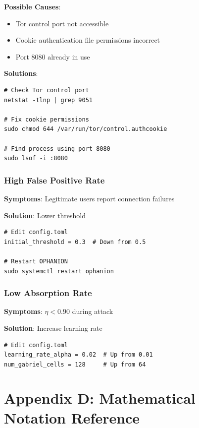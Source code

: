 \documentclass[11pt,a4paper]{article}
\begin{document}
\textbf{Possible Causes}:
\begin{itemize}
\item Tor control port not accessible
\item Cookie authentication file permissions incorrect
\item Port 8080 already in use
\end{itemize}

\textbf{Solutions}:
\begin{verbatim}
# Check Tor control port
netstat -tlnp | grep 9051

# Fix cookie permissions
sudo chmod 644 /var/run/tor/control.authcookie

# Find process using port 8080
sudo lsof -i :8080
\end{verbatim}

\subsubsection{High False Positive Rate}

\textbf{Symptoms}: Legitimate users report connection failures

\textbf{Solution}: Lower threshold
\begin{verbatim}
# Edit config.toml
initial_threshold = 0.3  # Down from 0.5

# Restart OPHANION
sudo systemctl restart ophanion
\end{verbatim}

\subsubsection{Low Absorption Rate}

\textbf{Symptoms}: $\eta < 0.90$ during attack

\textbf{Solution}: Increase learning rate
\begin{verbatim}
# Edit config.toml
learning_rate_alpha = 0.02  # Up from 0.01
num_gabriel_cells = 128     # Up from 64
\end{verbatim}

\section{Appendix D: Mathematical Notation Reference}
\end{document}
